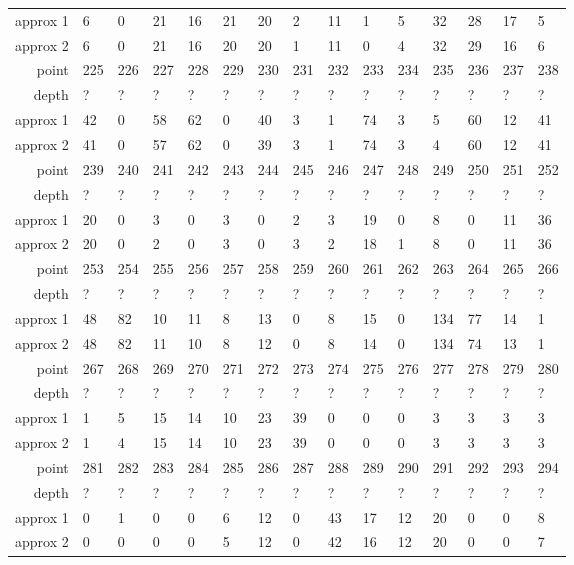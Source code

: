 \begin{center}
\begin{supertabular}{|r|l l l l l l l l l l l l l l|}
approx 1 & 6 & 0 & 21 & 16 & 21 & 20 & 2 & 11 & 1 & 5 & 32 & 28 & 17 & 5 \\
approx 2 & 6 & 0 & 21 & 16 & 20 & 20 & 1 & 11 & 0 & 4 & 32 & 29 & 16 & 6 \\
\hline
point & 225 & 226 & 227 & 228 & 229 & 230 & 231 & 232 & 233 & 234 & 235 & 236 & 237 & 238 \\
\hline
depth & ? & ? & ? & ? & ? & ? & ? & ? & ? & ? & ? & ? & ? & ? \\
approx 1 & 42 & 0 & 58 & 62 & 0 & 40 & 3 & 1 & 74 & 3 & 5 & 60 & 12 & 41 \\
approx 2 & 41 & 0 & 57 & 62 & 0 & 39 & 3 & 1 & 74 & 3 & 4 & 60 & 12 & 41 \\
\hline
point & 239 & 240 & 241 & 242 & 243 & 244 & 245 & 246 & 247 & 248 & 249 & 250 & 251 & 252 \\
\hline
depth & ? & ? & ? & ? & ? & ? & ? & ? & ? & ? & ? & ? & ? & ? \\
approx 1 & 20 & 0 & 3 & 0 & 3 & 0 & 2 & 3 & 19 & 0 & 8 & 0 & 11 & 36 \\
approx 2 & 20 & 0 & 2 & 0 & 3 & 0 & 3 & 2 & 18 & 1 & 8 & 0 & 11 & 36 \\
\hline
point & 253 & 254 & 255 & 256 & 257 & 258 & 259 & 260 & 261 & 262 & 263 & 264 & 265 & 266 \\
\hline
depth & ? & ? & ? & ? & ? & ? & ? & ? & ? & ? & ? & ? & ? & ? \\
approx 1 & 48 & 82 & 10 & 11 & 8 & 13 & 0 & 8 & 15 & 0 & 134 & 77 & 14 & 1 \\
approx 2 & 48 & 82 & 11 & 10 & 8 & 12 & 0 & 8 & 14 & 0 & 134 & 74 & 13 & 1 \\
\hline
point & 267 & 268 & 269 & 270 & 271 & 272 & 273 & 274 & 275 & 276 & 277 & 278 & 279 & 280 \\
\hline
depth & ? & ? & ? & ? & ? & ? & ? & ? & ? & ? & ? & ? & ? & ? \\
approx 1 & 1 & 5 & 15 & 14 & 10 & 23 & 39 & 0 & 0 & 0 & 3 & 3 & 3 & 3 \\
approx 2 & 1 & 4 & 15 & 14 & 10 & 23 & 39 & 0 & 0 & 0 & 3 & 3 & 3 & 3 \\
\hline
point & 281 & 282 & 283 & 284 & 285 & 286 & 287 & 288 & 289 & 290 & 291 & 292 & 293 & 294 \\
\hline
depth & ? & ? & ? & ? & ? & ? & ? & ? & ? & ? & ? & ? & ? & ? \\
approx 1 & 0 & 1 & 0 & 0 & 6 & 12 & 0 & 43 & 17 & 12 & 20 & 0 & 0 & 8 \\
approx 2 & 0 & 0 & 0 & 0 & 5 & 12 & 0 & 42 & 16 & 12 & 20 & 0 & 0 & 7 \\

\end{supertabular}
\end{center}
